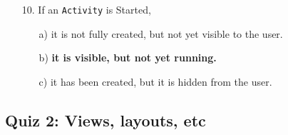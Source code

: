 \documentclass[12pt]{article}
\begin{document}
\begin{itemize}
    \item[10.] If an \texttt{Activity} is Started,
    \begin{itemize}
        \item[a)] it is not fully created, but not yet visible to the user.
        \item[b)] \textbf{it is visible, but not yet running.}
        \item[c)] it has been created, but it is hidden from the user.
    \end{itemize}

\end{itemize}

\subsection*{Quiz 2: Views, layouts, etc}
\end{document}
